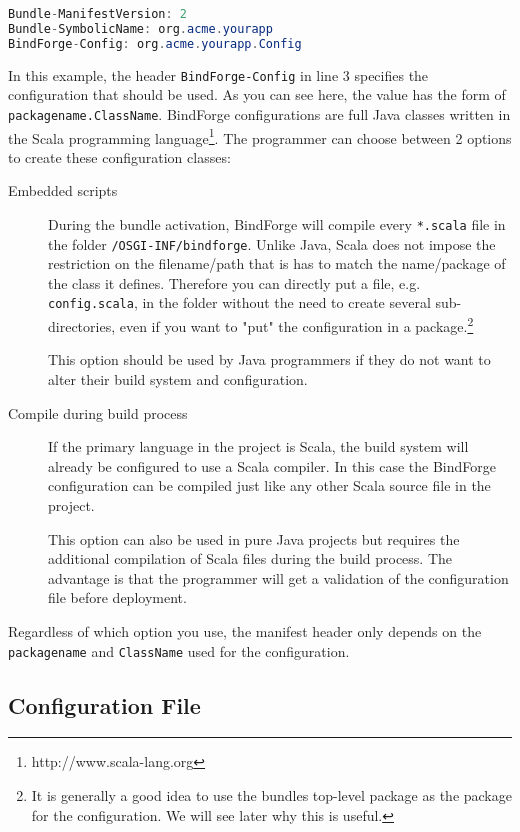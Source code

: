 \begin{lstlisting}[caption={MANIFEST.MF with Configuration},label=config_manifest,language=Java]
Bundle-ManifestVersion: 2
Bundle-SymbolicName: org.acme.yourapp
BindForge-Config: org.acme.yourapp.Config
\end{lstlisting}

In this example, the header \verb!BindForge-Config! in line 3 specifies the configuration that should be used. As you can see here, the value has the form of \verb!packagename.ClassName!. BindForge configurations are full Java classes written in the Scala programming language\footnote{http://www.scala-lang.org}. The programmer can choose between 2 options to create these configuration classes:

\begin{description}
 \item[Embedded scripts] During the bundle activation, BindForge will compile every \verb!*.scala! file in the folder \verb!/OSGI-INF/bindforge!. Unlike Java, Scala does not impose the restriction on the filename/path that is has to match the name/package of the class it defines. Therefore you can directly put a file, e.g. \verb!config.scala!, in the folder without the need to create several sub-directories, even if you want to "put" the configuration in a package.\footnote{It is generally a good idea to use the bundles top-level package as the package for the configuration. We will see later why this is useful.}

This option should be used by Java programmers if they do not want to alter their build system and configuration.

 \item[Compile during build process] If the primary language in the project is Scala, the build system will already be configured to use a Scala compiler. In this case the BindForge configuration can be compiled just like any other Scala source file in the project.

This option can also be used in pure Java projects but requires the additional compilation of Scala files during the build process. The advantage is that the programmer will get a validation of the configuration file before deployment.
\end{description}

Regardless of which option you use, the manifest header only depends on the \verb!packagename! and \verb!ClassName! used for the configuration. 

\subsection{Configuration File}

